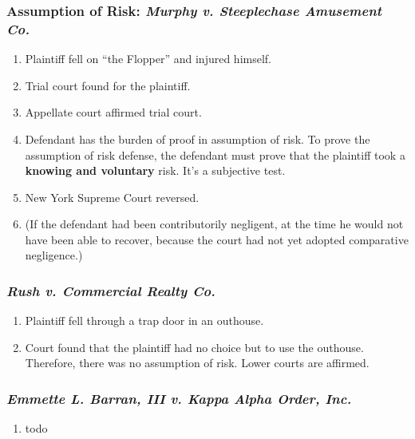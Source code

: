\subsubsection{Assumption of Risk: \emph{Murphy v. Steeplechase Amusement 
Co.}} %

\begin{enumerate}
    \item Plaintiff fell on ``the Flopper'' and injured himself.
    \item Trial court found for the plaintiff.
    \item Appellate court affirmed trial court.
    \item Defendant has the burden of proof in assumption of risk. To prove the assumption of risk defense, the defendant must prove that the plaintiff took a \textbf{knowing and voluntary} risk. It's a subjective test.
    \item New York Supreme Court reversed. 
    \item (If the defendant had been contributorily negligent, at the time he would not have been able to recover, because the court had not yet adopted comparative negligence.)
\end{enumerate}

\subsubsection{\emph{Rush v. Commercial Realty Co.}} %

\begin{enumerate}
    \item Plaintiff fell through a trap door in an outhouse.
    \item Court found that the plaintiff had no choice but to use the outhouse. Therefore, there was no assumption of risk. Lower courts are affirmed.
\end{enumerate}

\subsubsection{\emph{Emmette L. Barran, III v. Kappa Alpha Order, Inc.}} %

\begin{enumerate}
    \item todo
\end{enumerate}

